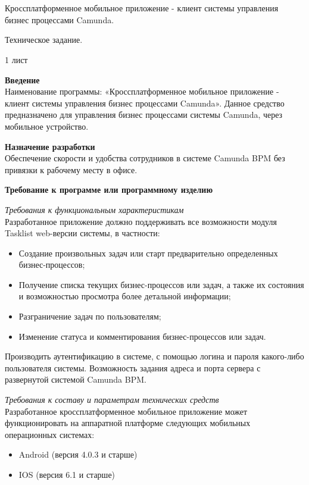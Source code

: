 \chapter{}
\vspace{7em}
\begin{center}
	Кроссплатформенное мобильное приложение - клиент системы управления бизнес процессами Camunda.
\end{center}

\begin{center}
	Техническое задание.
\end{center}
\begin{center}
	1 лист
\end{center}

\newpage
\textbf{Введение}\\
Наименование программы: «Кроссплатформенное мобильное приложение - клиент системы управления бизнес процессами Camunda». Данное средство предназначено для управления бизнес процессами системы Camunda, через мобильное устройство. 

\textbf{Назначение разработки}\\
Обеспечение скорости и удобства сотрудников в системе Camunda BPM без привязки к рабочему месту в офисе.

\textbf{Требование к программе или программному изделию}

\textit{Требования к функциональным характеристикам}\\
Разработанное приложение должно поддерживать все возможности модуля Tasklist web-версии системы, в частности:
\begin{itemize}
	\item Создание произвольных задач или старт предварительно определенных бизнес-процессов;
	\item Получение списка текущих бизнес-процессов или задач, а также их состояния и возможностью просмотра более детальной информации;
	\item Разграничение задач по пользователям;
	\item Изменение статуса и комментирования бизнес-процессов или задач.
\end{itemize}
Производить аутентификацию в системе, с помощью логина и пароля какого-либо пользователя системы. Возможность задания адреса и порта сервера с развернутой системой Camunda BPM.

\textit{Требования к составу и параметрам технических средств}\\
Разработанное кроссплатформенное мобильное приложение может функционировать на аппаратной платформе следующих мобильных операционных системах:
\begin{itemize}
	\item Android (версия 4.0.3 и старше)
	\item IOS (версия 6.1 и старше)
\end{itemize}

